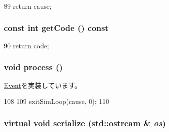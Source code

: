 \begin{DoxyCode}
89 { return cause; }
\end{DoxyCode}
\hypertarget{classLocalSimLoopExitEvent_a58a2e3d87f99241c0363c9765b3ef3e9}{
\subsubsection[{getCode}]{\setlength{\rightskip}{0pt plus 5cm}const int getCode () const}}
\label{classLocalSimLoopExitEvent_a58a2e3d87f99241c0363c9765b3ef3e9}



\begin{DoxyCode}
90 { return code; }
\end{DoxyCode}
\hypertarget{classLocalSimLoopExitEvent_a2e9c5136d19b1a95fc427e0852deab5c}{
\subsubsection[{process}]{\setlength{\rightskip}{0pt plus 5cm}void process ()}}
\label{classLocalSimLoopExitEvent_a2e9c5136d19b1a95fc427e0852deab5c}


\hyperlink{classEvent_a142b75b68a6291400e20fb0dd905b1c8}{Event}を実装しています。


\begin{DoxyCode}
108 {
109     exitSimLoop(cause, 0);
110 }
\end{DoxyCode}
\hypertarget{classLocalSimLoopExitEvent_ad6272f80ae37e8331e3969b3f072a801}{
\subsubsection[{serialize}]{\setlength{\rightskip}{0pt plus 5cm}virtual void serialize (std::ostream \& {\em os})}}
\label{classLocalSimLoopExitEvent_ad6272f80ae37e8331e3969b3f072a801}



